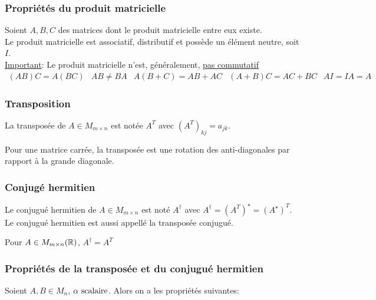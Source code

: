 
\subsubsection{Propriétés du produit matricielle}
Soient $A, B, C$ des matrices dont le produit matricielle entre eux existe. \\
Le produit matricielle est associatif, distributif et possède un élément neutre, soit $I$. \\
\underline{Important}: Le produit matricielle n'est, généralement, \underline{pas commutatif}
\[
    \begin{matrix}
        (AB)C = A(BC) & AB \neq BA & A(B + C) = AB + AC & (A + B)C = AC + BC & AI = IA = A
    \end{matrix}
\]

\subsubsection{Transposition}
\begin{definition}
    La transposée de $A \in M_{m \times n}$ est notée $A^T$ avec $\left(A^T\right)_{kj} = a_{jk}$.
    \begin{remark}
        Pour une matrice carrée, la transposée est une rotation des anti-diagonales par rapport à la grande diagonale.
    \end{remark}
\end{definition}

\subsubsection{Conjugé hermitien}
\begin{definition}
    Le conjugué hermitien de $A \in M_{m \times n}$ est noté $A^\dagger$ avec $A^\dagger = \left(A^T\right)^\star = \left(A^\star\right)^T$.
    Le conjugué hermitien est aussi appellé la transposée conjugué.
\end{definition}
\begin{remark}
    Pour $A \in M_{m \times n}(\mathbb{R})$, $A^\dagger = A^T$
\end{remark}

\subsubsection{Propriétés de la transposée et du conjugué hermitien}
Soient $A, B \in M_n$, $\alpha \text{ scalaire}$. Alors on a les propriétés suivantes:

